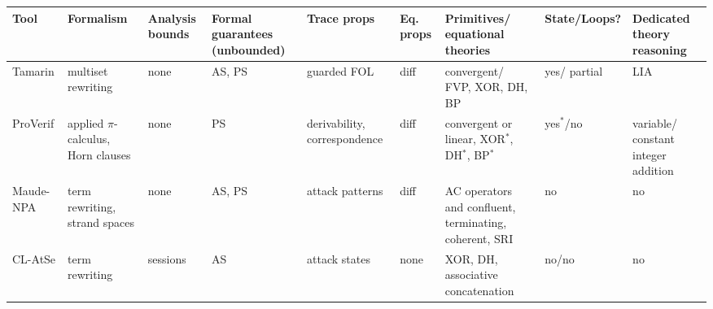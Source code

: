 
\begin{table}[h!]
\centering
\footnotesize
\begin{tabular}{|p{1.3cm}|p{1.8cm}p{1.3cm}p{1.5cm}p{1.4cm}p{.8cm}p{1.9cm}p{1cm}p{1.6cm}|}
\hline
\textbf{Tool} &
\textbf{Formalism} &
\textbf{Analysis bounds} & %
\textbf{Formal} \newline \textbf{guarantees} \newline (unbounded) &
\textbf{Trace props} &
\textbf{Eq. props} &
\textbf{Primitives/ equational theories} &
\textbf{State/\newline Loops?} &
\textbf{Dedicated theory reasoning} \\
\hline

\rowcolor{grouponeDark}
Tamarin \cite{tamarin} & multiset rewriting & none & AS, PS & guarded FOL & diff & convergent/ FVP, XOR, DH, BP & yes/ partial & LIA \\

\rowcolor{grouponeLight}
ProVerif \cite{proverif} & applied \newline $\pi$-calculus, Horn clauses & none & PS & derivability, correspondence & diff & convergent or \newline linear, XOR$^*$, DH$^*$, BP$^*$ & yes$^*$/no & variable/ constant integer \newline addition \\

\rowcolor{grouponeDark}
Maude-NPA \cite{maude_npa} & term \newline rewriting, strand spaces & none & AS, PS & attack \newline patterns & diff & AC operators and confluent, \newline terminating, coherent, SRI & no & no \\
\hhline{|=========|}

\rowcolor{grouptwoDark}
CL-AtSe \cite{cl_atse} & term \newline rewriting & sessions & AS & attack states & none & XOR, DH, \newline associative concatenation & no/no & no \\


\end{tabular}
\end{table}
